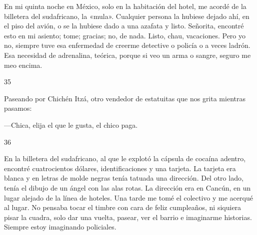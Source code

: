 \documentclass[12pt,twoside,openright,a5paper]{book}
\begin{document}
\nopagebreak

En mi quinta noche en México, solo en la habitación del hotel, me acordé
de la billetera del sudafricano, la «mula». Cualquier persona la hubiese
dejado ahí, en el piso del avión, o se la hubiese dado a una azafata
y listo. Señorita, encontré esto en mi asiento; tome; gracias; no, de
nada. Listo, chau, vacaciones. Pero yo no, siempre tuve esa enfermedad de
creerme detective o policía o a veces ladrón. Esa necesidad de adrenalina,
teórica, porque si veo un arma o sangre, seguro me meo encima.

\vspace{0.5cm}

\hrulefill \hspace{0.1cm}\decofourleft\hspace{0.2cm} 35 \hspace{0.2cm}\decofourright \hspace{0.1cm}\hrulefill

\nopagebreak

\vspace{0.5cm}

\nopagebreak

Paseando por Chichén Itzá, otro vendedor de estatuitas que nos grita mientras
pasamos:

---Chica, elija el que le gusta, el chico paga.

\vspace{0.5cm}

\hrulefill \hspace{0.1cm}\decofourleft\hspace{0.2cm} 36 \hspace{0.2cm}\decofourright \hspace{0.1cm}\hrulefill

\nopagebreak

\vspace{0.5cm}

\nopagebreak

En la billetera del sudafricano, al que le explotó la cápsula
de cocaína adentro, encontré cuatrocientos dólares, identificaciones y una
tarjeta. La tarjeta era blanca y en letras de molde negras tenía tatuada
una dirección. Del otro lado, tenía el dibujo de un ángel con las alas
rotas. La dirección era en Cancún, en un lugar alejado de la línea de
hoteles. Una tarde me tomé el colectivo y me acerqué al lugar. No pensaba
tocar el timbre con cara de feliz cumpleaños, ni siquiera pisar la cuadra,
solo dar una vuelta, pasear, ver el barrio e imaginarme historias. Siempre
estoy imaginando policiales.
\end{document}
